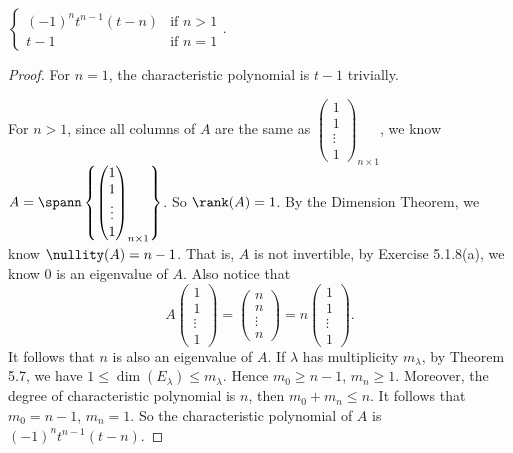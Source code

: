 \begin{Exercise}
\begin{answer}
$\begin{cases}
(-1)^n t^{n-1} (t-n) & \mbox{if }n>1 \\
t-1 & \mbox{if } n=1
\end{cases}$.
\end{answer}
\begin{proof}
For $n=1$, the characteristic polynomial is $t-1$ trivially.

For $n>1$, since all columns of $A$ are the same as $\begin{pmatrix}
1 \\
1 \\
\vdots \\
1
\end{pmatrix}_{n\times 1}$, we know $A = \spann\left\{\begin{pmatrix}
1 \\
1 \\
\vdots \\
1
\end{pmatrix}_{n\times 1}\right\}$. So $\rank(A) = 1$. By the Dimension Theorem, we know $\nullity(A) = n-1$. That is, $A$ is not invertible, by Exercise 5.1.8(a), we know $0$ is an eigenvalue of $A$. Also notice that
$$
A\begin{pmatrix}
1 \\
1 \\
\vdots \\
1
\end{pmatrix} = \begin{pmatrix}
n \\
n \\
\vdots \\
n
\end{pmatrix} = n\begin{pmatrix}
1 \\
1 \\
\vdots \\
1
\end{pmatrix}.
$$
It follows that $n$ is also an eigenvalue of $A$. If $\lambda$ has multiplicity $m_{\lambda}$, by Theorem 5.7, we have $1\leq \dim(E_{\lambda}) \leq m_{\lambda}$. Hence $m_0 \geq n-1$, $m_n \geq 1$. Moreover, the degree of characteristic polynomial is $n$, then $m_0 + m_n \leq n$. It follows that $m_0 = n-1$, $m_n = 1$. So the characteristic polynomial of $A$ is $(-1)^n t^{n-1} (t-n)$. 
\end{proof}
\end{Exercise}